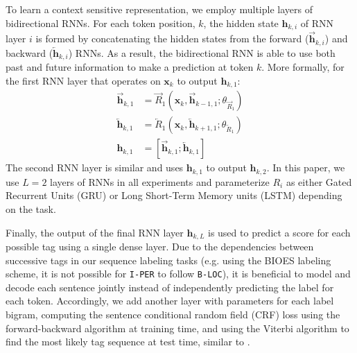 \documentclass[11pt,a4paper]{article}
\begin{document}
To learn a context sensitive representation, we employ multiple layers of bidirectional RNNs.
For each token position, $k$, the hidden state
$\mathbf{h}_{k,i}$ of RNN layer $i$ is formed
by concatenating the hidden states from the forward ($\overrightarrow{\mathbf{h}}_{k,i}$) and backward ($\overleftarrow{\mathbf{h}}_{k,i}$) RNNs.  As a result, the bidirectional RNN is able to use both past and future information
to make a prediction at token $k$.  More formally, for the first RNN layer that operates on $\mathbf{x}_k$ to output $\mathbf{h}_{k,1}$:
\begin{align}
\overrightarrow{\mathbf{h}}_{k,1} & = \overrightarrow{R}_1 (\mathbf{x}_k, \overrightarrow{\mathbf{h}}_{k-1,1}; \theta_{\overrightarrow{R}_1}) \nonumber \\
\overleftarrow{\mathbf{h}}_{k,1} & = \overleftarrow{R}_1 (\mathbf{x}_k, \overleftarrow{\mathbf{h}}_{k+1,1}; \theta_{\overleftarrow{R}_1}) \nonumber \\
\mathbf{h}_{k,1} & = [\overrightarrow{\mathbf{h}}_{k,1}; \overleftarrow{\mathbf{h}}_{k,1}] \label{eqn:rnn1}
\end{align}
The second RNN layer is similar and uses $\mathbf{h}_{k,1}$ to output $\mathbf{h}_{k,2}$.
In this paper, we use $L=2$ layers of RNNs in all experiments and parameterize $R_i$ as either
Gated Recurrent Units (GRU) \citep{GRU:Cho2014} or
Long Short-Term Memory units (LSTM) \citep{LSTM:Hochreiter1997} depending on the task.

Finally, the output of the final RNN layer $\mathbf{h}_{k,L}$ is used to predict a score for each possible
tag using a single dense layer.  Due to the dependencies between successive tags in our sequence labeling tasks
(e.g. using the BIOES labeling scheme, it is not possible for \texttt{I-PER} to follow \texttt{B-LOC}), it
is beneficial to model and decode each sentence jointly instead of independently predicting the label for each token.
Accordingly, we add another layer with parameters for each label bigram, computing the sentence conditional random field (CRF) loss
\citep{CRF:Lafferty2001} using the forward-backward algorithm at training time, and using the Viterbi algorithm to find the most likely tag sequence at test time, similar to \citet{NLPfromScratch:Collobert2011}.
\end{document}
